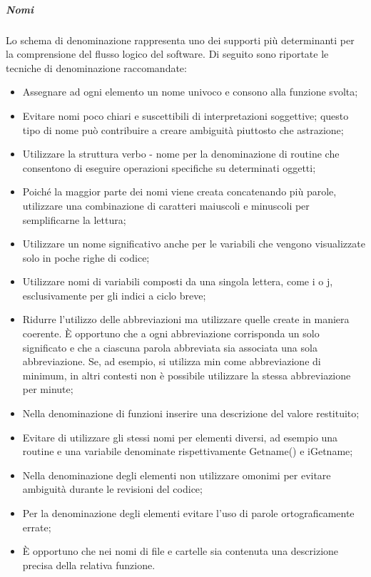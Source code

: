 \subparagraph{Nomi}
Lo schema di denominazione rappresenta uno dei supporti più determinanti per la comprensione del flusso logico del software. 
Di seguito sono riportate le tecniche di denominazione raccomandate:
\begin{itemize} 
\item
Assegnare ad ogni elemento un nome univoco e consono alla funzione svolta; 
\item
Evitare nomi poco chiari e suscettibili di interpretazioni soggettive; questo tipo di nome può contribuire a creare ambiguità piuttosto che astrazione;
\item
Utilizzare la struttura verbo - nome per la denominazione di routine che consentono di eseguire operazioni specifiche su determinati oggetti;
\item
Poiché la maggior parte dei nomi viene creata concatenando più parole, utilizzare una combinazione di caratteri maiuscoli e minuscoli per semplificarne la lettura;
\item
Utilizzare un nome significativo anche per le variabili che vengono visualizzate solo in poche righe di codice;
\item
Utilizzare nomi di variabili composti da una singola lettera, come i o j, esclusivamente per gli indici a ciclo breve;
\item
Ridurre l'utilizzo delle abbreviazioni ma utilizzare quelle create in maniera coerente. È opportuno che a ogni abbreviazione corrisponda un solo significato e che a ciascuna parola abbreviata sia associata una sola abbreviazione. Se, ad esempio, si utilizza min come abbreviazione di minimum, in altri contesti non è possibile utilizzare la stessa abbreviazione per minute;
\item
Nella denominazione di funzioni inserire una descrizione del valore restituito;
\item
Evitare di utilizzare gli stessi nomi per elementi diversi, ad esempio una routine e una variabile denominate rispettivamente Getname() e iGetname;
\item
Nella denominazione degli elementi non utilizzare omonimi per evitare ambiguità durante le revisioni del codice;
\item
Per la denominazione degli elementi evitare l'uso di parole ortograficamente errate;
\item
È opportuno che nei nomi di file e cartelle sia contenuta una descrizione precisa della relativa funzione.
\end{itemize}


